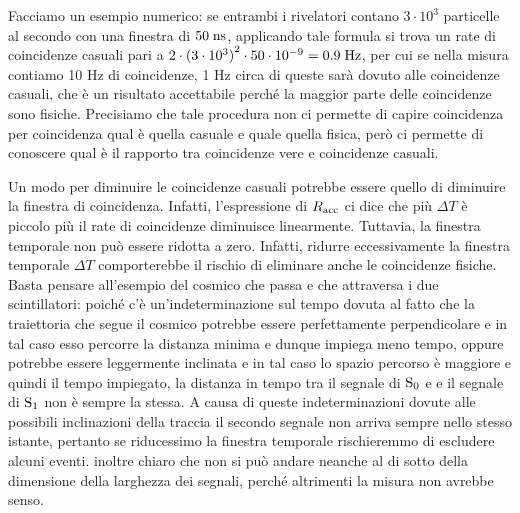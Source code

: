 Facciamo un esempio numerico: se entrambi i rivelatori contano $3 \cdot 10^3$ particelle al secondo con una finestra di $50 \; \rm ns$, applicando tale formula si trova un rate di coincidenze casuali pari a $2 \cdot {(3 \cdot 10^3)}^2 \cdot 50 \cdot 10^{-9}=0.9 \; \rm Hz$, per cui se nella misura contiamo 10 Hz di coincidenze, 1 Hz circa di queste sarà dovuto alle coincidenze casuali, che è un risultato accettabile perché la maggior parte delle coincidenze sono fisiche. Precisiamo che tale procedura non ci permette di capire coincidenza per coincidenza qual è quella casuale e quale quella fisica, però ci permette di conoscere qual è il rapporto tra coincidenze vere e coincidenze casuali.

Un modo per diminuire le coincidenze casuali potrebbe essere quello di diminuire la finestra di coincidenza. Infatti, l'espressione di $R_{\rm acc}$ ci dice che più $\Delta T$ è piccolo più il rate di coincidenze diminuisce linearmente. Tuttavia, la finestra temporale non può essere ridotta a zero. Infatti, ridurre eccessivamente la finestra temporale $\Delta T$ comporterebbe il rischio di eliminare anche le coincidenze fisiche. Basta pensare all'esempio del cosmico che passa e che attraversa i due scintillatori: poiché c'è un'indeterminazione sul tempo dovuta al fatto che la traiettoria che segue il cosmico potrebbe essere perfettamente perpendicolare e in tal caso esso percorre la distanza minima e dunque impiega meno tempo, oppure potrebbe essere leggermente inclinata e in tal caso lo spazio percorso è maggiore e quindi il tempo impiegato, la distanza in tempo tra il segnale di $\rm S_0$ e e il segnale di $\rm S_1$ non è sempre la stessa. A causa di queste indeterminazioni dovute alle possibili inclinazioni della traccia il secondo segnale non arriva sempre nello stesso istante, pertanto se riducessimo la finestra temporale rischieremmo di escludere alcuni eventi. \E inoltre chiaro che non si può andare neanche al di sotto della dimensione della larghezza dei segnali, perché altrimenti la misura non avrebbe senso.

